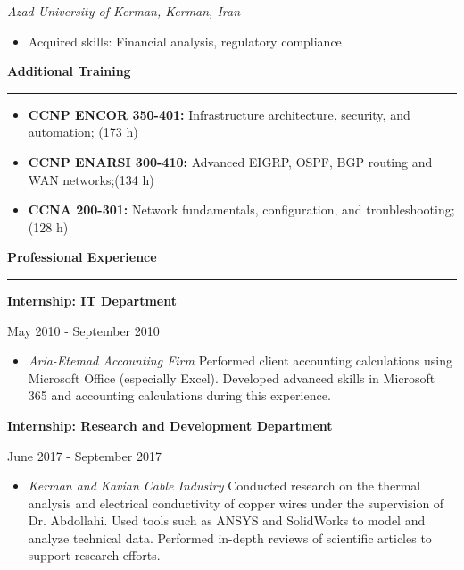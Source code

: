 \documentclass[a4paper]{letter}
\newcommand{\divider}{\rule{\linewidth}{0.9pt}}
\begin{document}
\begin{minipage}[t]{0.60\textwidth}
{\textit{Azad University of Kerman, Kerman, Iran}}


\begin{itemize}
    \footnotesize
    \item Acquired skills: Financial analysis, regulatory compliance
\end{itemize}

\vspace{ 2mm}


{\large \textbf{Additional Training}}
\divider
\vspace{4mm}
\begin{itemize}
    \footnotesize \item {\textbf{CCNP ENCOR 350-401:} Infrastructure architecture, security, and automation; (173 h)}
    \vspace{2mm}
    \footnotesize \item {\textbf{CCNP ENARSI 300-410:} Advanced EIGRP, OSPF, BGP routing and WAN networks;(134 h)}
    \vspace{2mm}
    \footnotesize \item {\textbf{CCNA 200-301:} Network fundamentals, configuration, and troubleshooting; (128 h)}
\end{itemize}
\vspace{ 2mm}


{\large \textbf{Professional Experience}}
\divider

 
{\textbf{Internship: IT Department}}

{\footnotesize May 2010 - September 2010}
\begin{itemize}
    \footnotesize \item \textit{Aria-Etemad Accounting Firm}
   \newline
    Performed client accounting calculations using Microsoft Office (especially Excel). Developed advanced skills in Microsoft 365 and accounting calculations during this experience.
\end{itemize}

\vspace{ 2mm}
{\textbf{Internship: Research and Development Department}}

{\footnotesize June 2017 - September 2017}
\begin{itemize}
    \footnotesize \item \textit{Kerman and Kavian Cable Industry}
   \newline
    Conducted research on the thermal analysis and electrical conductivity of copper wires under the supervision of Dr. Abdollahi. Used tools such as ANSYS and SolidWorks to model and analyze technical data. Performed in-depth reviews of scientific articles to support research efforts.
\end{itemize}


\end{minipage}
\end{document}
